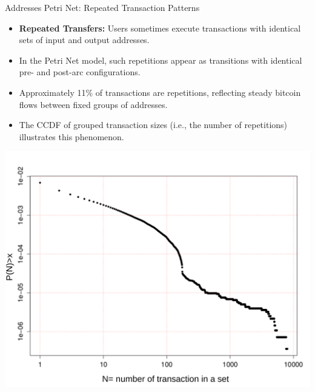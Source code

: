 \documentclass{beamer}
\begin{document}
\begin{frame}{Addresses Petri Net: Repeated Transaction Patterns}
    \footnotesize
    \vspace{-0.2cm}
    \begin{itemize}
        \item \textbf{Repeated Transfers:} Users sometimes execute transactions with identical sets of input and output addresses.
        \item In the Petri Net model, such repetitions appear as transitions with identical pre- and post-arc configurations.
        \item Approximately 11\% of transactions are repetitions, reflecting steady bitcoin flows between fixed groups of addresses.
        \item The CCDF of grouped transaction sizes (i.e., the number of repetitions) illustrates this phenomenon.
    \end{itemize}
    \vspace{-0.2cm}
    \centering
    \includegraphics[width=0.5\linewidth]{groupTA}
    \label{fig_transA_CCDF}
\end{frame}
\end{document}
